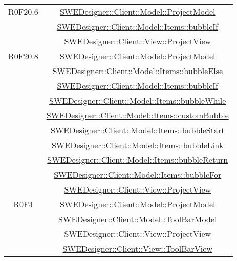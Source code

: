 \documentclass[../DefinizioneDiProdotto.tex]{subfiles}
\begin{document}
\begin{longtable}{|c|c|}
				R0F20.6
				& \hyperlink{SWEDesigner::Client::Model::ProjectModel}{SWEDesigner::Client::Model::ProjectModel}\\
				& \hyperlink{SWEDesigner::Client::Model::Items::bubbleIf}{SWEDesigner::Client::Model::Items::bubbleIf}\\
				& \hyperlink{SWEDesigner::Client::View::ProjectView}{SWEDesigner::Client::View::ProjectView}\\
				\hline

				R0F20.8
				& \hyperlink{SWEDesigner::Client::Model::ProjectModel}{SWEDesigner::Client::Model::ProjectModel}\\
				& \hyperlink{SWEDesigner::Client::Model::Items::bubbleElse}{SWEDesigner::Client::Model::Items::bubbleElse}\\
				& \hyperlink{SWEDesigner::Client::Model::Items::bubbleIf}{SWEDesigner::Client::Model::Items::bubbleIf}\\
				& \hyperlink{SWEDesigner::Client::Model::Items::bubbleWhile}{SWEDesigner::Client::Model::Items::bubbleWhile}\\
				& \hyperlink{SWEDesigner::Client::Model::Items::customBubble}{SWEDesigner::Client::Model::Items::customBubble}\\
				& \hyperlink{SWEDesigner::Client::Model::Items::bubbleStart}{SWEDesigner::Client::Model::Items::bubbleStart}\\
				& \hyperlink{SWEDesigner::Client::Model::Items::bubbleLink}{SWEDesigner::Client::Model::Items::bubbleLink}\\
				& \hyperlink{SWEDesigner::Client::Model::Items::bubbleReturn}{SWEDesigner::Client::Model::Items::bubbleReturn}\\
				& \hyperlink{SWEDesigner::Client::Model::Items::bubbleFor}{SWEDesigner::Client::Model::Items::bubbleFor}\\
				& \hyperlink{SWEDesigner::Client::View::ProjectView}{SWEDesigner::Client::View::ProjectView}\\
				\hline

				R0F4
				& \hyperlink{SWEDesigner::Client::Model::ProjectModel}{SWEDesigner::Client::Model::ProjectModel}\\
				& \hyperlink{SWEDesigner::Client::Model::ToolBarModel}{SWEDesigner::Client::Model::ToolBarModel}\\
				& \hyperlink{SWEDesigner::Client::View::ProjectView}{SWEDesigner::Client::View::ProjectView}\\
				& \hyperlink{SWEDesigner::Client::View::ToolBarView}{SWEDesigner::Client::View::ToolBarView}\\
				\hline


\end{longtable}
\end{document}
